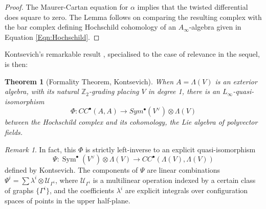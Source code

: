 \documentclass[reqno,10pt]{amsart}
\numberwithin{equation}{section}
\newcommand{\bZ}{{\mathbb Z}}
\newcommand{\Sym}{\operatorname{Sym}}
\newtheorem{Theorem}[thm]{Theorem}
\theoremstyle{remark}
\newtheorem{Remark}[thm]{Remark}
\begin{document}
\begin{proof}
The Maurer-Cartan equation for $\alpha$ implies that the twisted differential does square to zero. The Lemma follows on comparing the resulting complex with the bar complex defining Hochschild cohomology of an $A_{\infty}$-algebra given in Equation \ref{Eqn:Hochschild}.
\end{proof}


Kontsevich's remarkable result \cite{Kontsevich}, specialised to the case of relevance in the sequel, is then:

\begin{Theorem}[Formality Theorem, Kontsevich] \label{Thm:KontsevichFormality}
When $A=\Lambda(V)$ is an exterior algebra, with its natural $\bZ_2$-grading placing $V$ in degree 1, there is an $L_{\infty}$-quasi-isomorphism
\[
\Phi: CC^{\bullet}(A,A) \longrightarrow Sym^{\bullet}(V^{\vee}) \otimes \Lambda(V)
\]
between the Hochschild complex and its cohomology, the Lie algebra of polyvector fields.
\end{Theorem}

\begin{Remark}\label{Rem:Quasi-Inverse}
In fact, this $\Phi$ is strictly left-inverse to an explicit quasi-isomorphism
\[
\Psi: \Sym^{\bullet}(V^{\vee}) \otimes \Lambda(V) \rightarrow CC^{\bullet}(\Lambda(V),\Lambda(V))
\]
defined by Kontsevich. The components of $\Psi$ are linear combinations $\Psi^i = \sum \lambda^i \otimes \mathcal{U}_{\Gamma^i}$, where $\mathcal{U}_{\Gamma^i}$ is a multilinear operation indexed by a certain class of graphs $\{\Gamma^i\}$, and the coefficients $\lambda^i$ are explicit integrals over configuration spaces of points in the upper half-plane.
\end{Remark}
\end{document}
